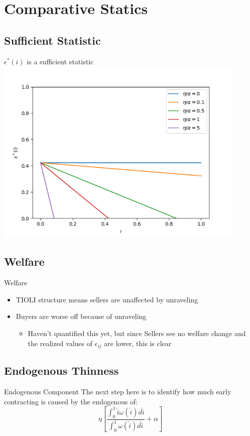 \documentclass{beamer}
\begin{document}
\section{Comparative Statics}
\subsection{Sufficient Statistic}
\begin{frame}{ $\epsilon^*(i)$ is a sufficient statistic}
	\includegraphics[width=0.9\textwidth]{epsilon_graph}
	
\end{frame}

\subsection{Welfare}
\begin{frame}{Welfare}
	\begin{itemize}
		\item TIOLI structure means sellers are unaffected by unraveling
		\item Buyers are worse off because of unraveling
		\begin{itemize}
			\item Haven't quantified this yet, but since Sellers see no welfare change and the realized values of $\epsilon_{ij}$ are lower, this is clear
		\end{itemize}
	\end{itemize}
\end{frame}

\subsection{Endogenous Thinness}
\begin{frame}{Endogenous Component}
The next step here is to identify how much early contracting is caused by the endogenous of:
$$	\eta  \left[ \frac{\int_0^1 \hat{i} \omega(\hat{i}) d\hat{i}}{\int_0^1  \omega(\hat{i}) d\hat{i} } + \alpha \right]$$
\end{frame}
\end{document}
